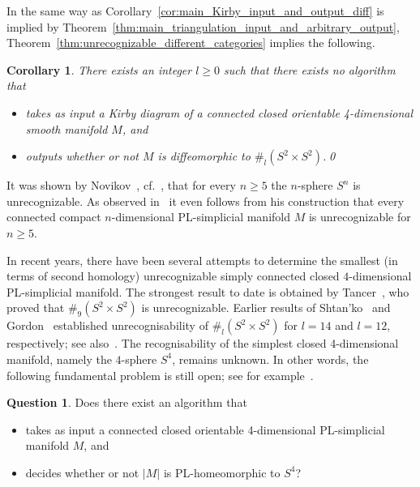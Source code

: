 \documentclass[a4paper, reqno]{amsart}
\newtheorem{corollary}[proposition]{Corollary}
\theoremstyle{definition}
\newtheorem{question}[proposition]{Question}
\theoremstyle{remark}
\renewcommand{\~}{\nobreak\ }
\begin{document}
In the same way as Corollary\~\ref{cor:main_Kirby_input_and_output_diff} is implied by Theorem\~\ref{thm:main_triangulation_input_and_arbitrary_output}, Theorem\~\ref{thm:unrecognizable_different_categories} implies the following. 

\begin{corollary}
\label{cor:unrecognizable_Kirby}
There exists an integer $l\geq0$ such that there exists no algorithm that 
\begin{itemize}
    \item takes as input a Kirby diagram of a connected closed orientable 4-dimensional smooth manifold $M$, and 
    \item outputs whether or not $M$ is diffeomorphic to $\#_l(S^2 \times S^2)$.\qed
\end{itemize}
\end{corollary}

It was shown by Novikov\~\cite{Novikov_sphere}, cf.\~\cite{Chernavsky}, that for every $n\geq5$ the $n$-sphere $S^n$ is unrecognizable. As observed in\~\cite{Chernavsky} it even follows from his construction that every connected compact $n$-dimensional PL-simplicial manifold $M$ is unrecognizable for $n\geq5$.

In recent years, there have been several attempts to determine the smallest (in terms of second homology) unrecognizable simply connected closed $4$-dimensional PL-simplicial manifold.
The strongest result to date is obtained by Tancer\~\cite{Tancer}, who proved that $\#_9(S^2\times S^2)$ is unrecognizable. 
Earlier results of Shtan'ko\~\cite{Stanko} and Gordon\~\cite{Gordon} established unrecognisability of $\#_l(S^2\times S^2)$ for $l=14$ and $l=12$, respectively; see also\~\cite{Chernavsky}. 
The recognisability of the simplest closed 4-dimensional manifold, namely the $4$-sphere $S^4$, remains unknown. In other words, the following fundamental problem is still open; see for example\~\cite{Weinberger,Kirby_Markovsthm,Gordon,Tancer}.

\begin{question}\label{conj:S4_intro}
Does there exist an algorithm that
\begin{itemize}
    \item takes as input a connected closed orientable 4-dimensional PL-simplicial manifold $M$, and
    \item decides whether or not $|M|$ is PL-homeomorphic to $S^4$?
\end{itemize}
\end{question}
\end{document}
